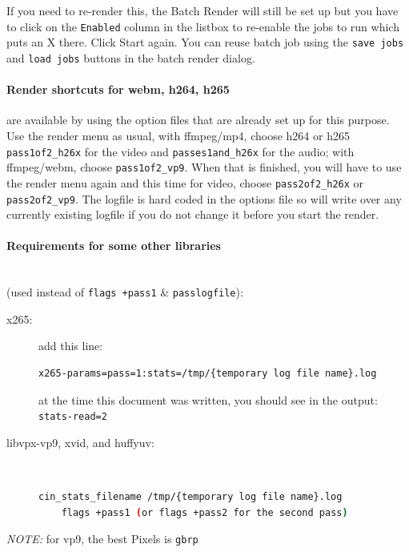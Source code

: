 If you need to re-render this, the Batch Render will still be set up but you have to click on the \texttt{Enabled} column in the listbox to re-enable the jobs to run which puts an X there.  Click Start again. You can reuse batch job using the \texttt{save jobs} and \texttt{load jobs} buttons in the batch render dialog.

\paragraph{Render shortcuts for webm, h264, h265} are available by using the option files that are already set up for this purpose.  Use the render menu as usual, with ffmpeg/mp4, choose h264 or h265 \texttt{pass1of2\_h26x} for the video and \texttt{passes1and\_h26x} for the audio; 
with ffmpeg/webm, choose \texttt{pass1of2\_vp9}.  When that is finished, you will have to use the render menu again and this time for video, choose \texttt{pass2of2\_h26x} or \texttt{pass2of2\_vp9}.  The logfile is hard coded in the options file so will write over any currently existing logfile if you do not change it before you start the render.

\paragraph{Requirements for some other libraries} ~\\ (used instead of \texttt{flags +pass1} \& \texttt{passlogfile}):

\begin{description}
    \item[x265:] add this line:
    \begin{lstlisting}[language=bash,numbers=none]
x265-params=pass=1:stats=/tmp/{temporary log file name}.log
    \end{lstlisting}      
    at the time this document was written, you should see in the output: \\  \texttt{stats-read=2}
    
    \item[libvpx-vp9, xvid, and huffyuv:]~

    \begin{lstlisting}[language=bash,numbers=none]
    cin_stats_filename /tmp/{temporary log file name}.log
    flags +pass1 (or flags +pass2 for the second pass)
    \end{lstlisting}    
\end{description}

\noindent \textit{NOTE:} for vp9, the best Pixels is \texttt{gbrp}

